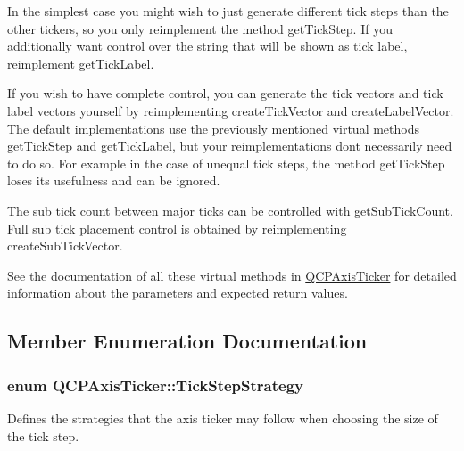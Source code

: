 In the simplest case you might wish to just generate different tick steps than the other tickers, so you only reimplement the method get\+Tick\+Step. If you additionally want control over the string that will be shown as tick label, reimplement get\+Tick\+Label.

If you wish to have complete control, you can generate the tick vectors and tick label vectors yourself by reimplementing create\+Tick\+Vector and create\+Label\+Vector. The default implementations use the previously mentioned virtual methods get\+Tick\+Step and get\+Tick\+Label, but your reimplementations don\textquotesingle{}t necessarily need to do so. For example in the case of unequal tick steps, the method get\+Tick\+Step loses its usefulness and can be ignored.

The sub tick count between major ticks can be controlled with get\+Sub\+Tick\+Count. Full sub tick placement control is obtained by reimplementing create\+Sub\+Tick\+Vector.

See the documentation of all these virtual methods in \hyperlink{classQCPAxisTicker}{Q\+C\+P\+Axis\+Ticker} for detailed information about the parameters and expected return values. 

\subsection{Member Enumeration Documentation}
\subsubsection[{\texorpdfstring{Tick\+Step\+Strategy}{TickStepStrategy}}]{\setlength{\rightskip}{0pt plus 5cm}enum {\bf Q\+C\+P\+Axis\+Ticker\+::\+Tick\+Step\+Strategy}}\hypertarget{classQCPAxisTicker_ab6d2f9d9477821623ac9bc4b21ddf49a}{}\label{classQCPAxisTicker_ab6d2f9d9477821623ac9bc4b21ddf49a}
Defines the strategies that the axis ticker may follow when choosing the size of the tick step.

